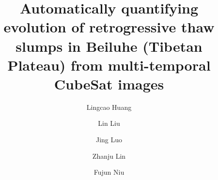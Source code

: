 \documentclass[authoryear,preprint,review,12pt]{elsarticle}
\begin{document}
\begin{frontmatter}




\title{Automatically quantifying evolution of retrogressive thaw slumps in Beiluhe (Tibetan Plateau) from multi-temporal CubeSat images}



\author[a,c]{Lingcao Huang}  
\author[a]{Lin Liu}
\author[b]{Jing Luo}
\author[b]{Zhanju Lin}
\author[b]{Fujun Niu}




\address[a]{Earth System Science Programme, Faculty of Science, The Chinese University of Hong Kong, Hong Kong SAR, China.}
\address[b]{Northwest Institute of Eco-Environment and Resources, Chinese Academy of Sciences, Lanzhou, China.}
\address[c]{Now at Earth Science and Observation Center, Cooperative Institute for Research in Environmental Sciences, University of Colorado Boulder, Boulder, USA.}


\begin{abstract}


\end{abstract}
\end{frontmatter}
\end{document}
